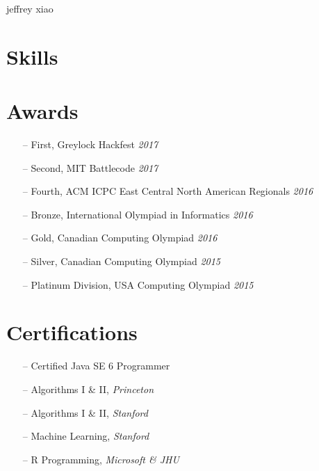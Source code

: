 \documentclass{resume}
\begin{document}
  \header%
    {jeffrey}%
    {xiao}%
    {}%
    {}%
  \begin{sidebar}
    \section{Skills}\vspace{-0.25cm}
    \section{Awards}
      \begin{itemize}[leftmargin=0.45cm, topsep=0.0cm]%
        \item[--] First, Greylock Hackfest \separator\emph{2017}
        \item[--] Second, MIT Battlecode \separator\emph{2017}
        \item[--] Fourth, ACM ICPC East Central North American Regionals \separator\emph{2016}
        \item[--] Bronze, International Olympiad in Informatics \separator\emph{2016}
        \item[--] Gold, Canadian Computing Olympiad \separator\emph{2016}
        \item[--] Silver, Canadian Computing Olympiad \separator\emph{2015}
        \item[--] Platinum Division, USA Computing Olympiad \separator\emph{2015}
      \end{itemize}%
    \section{Certifications}
      \begin{itemize}[leftmargin=0.45cm, noitemsep, topsep=0.0cm]%
        \item[--] Certified Java SE 6 Programmer
        \item[--] Algorithms I \& II, \emph{Princeton}
        \item[--] Algorithms I \& II, \emph{Stanford}
        \item[--] Machine Learning, \emph{Stanford}
        \item[--] R Programming, \emph{Microsoft \& JHU }
      \end{itemize}%

\end{sidebar}
\end{document}
